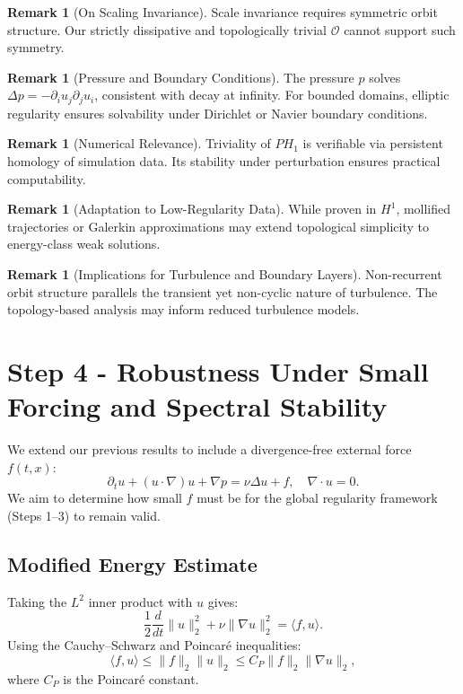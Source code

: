 \documentclass[11pt]{article}
\theoremstyle{definition}
\newtheorem{remark}[theorem]{Remark}
\begin{document}
\begin{remark}[On Scaling Invariance]
Scale invariance requires symmetric orbit structure. Our strictly dissipative and topologically trivial \( \mathcal{O} \) cannot support such symmetry.
\end{remark}

\begin{remark}[Pressure and Boundary Conditions]
The pressure \( p \) solves \( \Delta p = -\partial_i u_j \partial_j u_i \), consistent with decay at infinity. For bounded domains, elliptic regularity ensures solvability under Dirichlet or Navier boundary conditions.
\end{remark}

\begin{remark}[Numerical Relevance]
Triviality of \( PH_1 \) is verifiable via persistent homology of simulation data. Its stability under perturbation ensures practical computability.
\end{remark}

\begin{remark}[Adaptation to Low-Regularity Data]
While proven in \( H^1 \), mollified trajectories or Galerkin approximations may extend topological simplicity to energy-class weak solutions.
\end{remark}

\begin{remark}[Implications for Turbulence and Boundary Layers]
Non-recurrent orbit structure parallels the transient yet non-cyclic nature of turbulence. The topology-based analysis may inform reduced turbulence models.
\end{remark}

\section{Step 4 - Robustness Under Small Forcing and Spectral Stability}
\label{sec:step4}

We extend our previous results to include a divergence-free external force $f(t,x)$:
\[
\partial_t u + (u \cdot \nabla)u + \nabla p = \nu \Delta u + f,\quad \nabla \cdot u = 0.
\]
We aim to determine how small $f$ must be for the global regularity framework (Steps 1–3) to remain valid.

\subsection*{Modified Energy Estimate}
Taking the $L^2$ inner product with $u$ gives:
\[
\frac{1}{2} \frac{d}{dt} \|u\|_2^2 + \nu \|\nabla u\|_2^2 = \langle f, u \rangle.
\]
Using the Cauchy–Schwarz and Poincaré inequalities:
\[
\langle f, u \rangle \le \|f\|_2 \|u\|_2 \le C_P \|f\|_2 \|\nabla u\|_2,
\]
where $C_P$ is the Poincaré constant.
\end{document}

